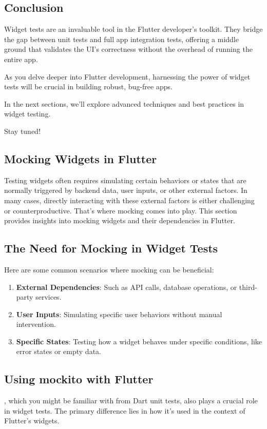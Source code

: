 \subsection*{Conclusion}
Widget tests are an invaluable tool in the Flutter developer's toolkit. 
They bridge the gap between unit tests and full app integration tests, offering a middle ground that validates the UI's correctness without the overhead of running the entire app.

As you delve deeper into Flutter development, harnessing the power of widget tests will be crucial in building robust, bug-free apps.

In the next sections, we'll explore advanced techniques and best practices in widget testing.

Stay tuned!

\subsection{Mocking Widgets in Flutter}

Testing widgets often requires simulating certain behaviors or states that are normally triggered by backend data, user inputs, or other external factors. 
In many cases, directly interacting with these external factors is either challenging or counterproductive. 
That's where mocking comes into play. 
This section provides insights into mocking widgets and their dependencies in Flutter.

\subsection*{The Need for Mocking in Widget Tests}
Here are some common scenarios where mocking can be beneficial:

\begin{enumerate}
 \item \textbf{External Dependencies}: Such as API calls, database operations, or third-party services.
 \item \textbf{User Inputs}: Simulating specific user behaviors without manual intervention.
 \item \textbf{Specific States}: Testing how a widget behaves under specific conditions, like error states or empty data.
\end{enumerate}

\subsection*{Using mockito with Flutter}
, which you might be familiar with from Dart unit tests, also plays a crucial role in widget tests. 
The primary difference lies in how it's used in the context of Flutter's widgets.

